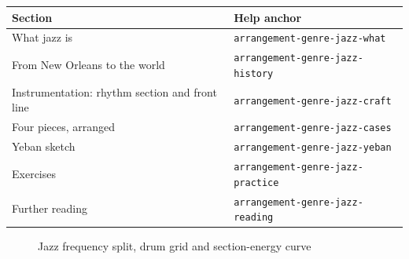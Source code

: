 \begin{helpmapping}
\begin{longtable}{p{}p{}}
\toprule
Section & Help anchor \\
\midrule
What jazz is & \texttt{arrangement-genre-jazz-what} \\
From New Orleans to the world & \texttt{arrangement-genre-jazz-history} \\
Instrumentation: rhythm section and front line & \texttt{arrangement-genre-jazz-craft} \\
Four pieces, arranged & \texttt{arrangement-genre-jazz-cases} \\
Yeban sketch & \texttt{arrangement-genre-jazz-yeban} \\
Exercises & \texttt{arrangement-genre-jazz-practice} \\
Further reading & \texttt{arrangement-genre-jazz-reading} \\
\bottomrule
\end{longtable}
\end{helpmapping}

\begin{figure}[htbp]\centering
{}
\caption{Jazz frequency split, drum grid and section-energy curve}
\end{figure}
